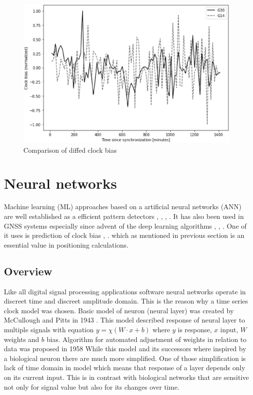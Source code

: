 \documentclass{article}
\begin{document}
\begin{figure}[htb] 
\centering
	\includegraphics[width=\textwidth]{figures/bias_normalized}
\caption{Comparison of diffed clock bias}
\label{fig:diffed_shifts}
\end{figure}

\FloatBarrier
\section{Neural networks}
Machine learning (ML) approaches based on a artificial neural networks (ANN) are
well established as a efficient pattern detectors \cite{Abiodun2019}, \cite{Faraway2008},
\cite{Khan2019}, \cite{Miller1993}.
It has also been used in GNSS systems especially since advent of the deep learning
algorithms \cite{Kim2019}, \cite{Perez2019}, \cite{Wei2016}.
One of it uses is prediction of clock bias  \cite{Indriyatmoko2008}, \cite{Wang2017}.
which as mentioned in previous section is an essential value in positioning calculations.

\subsection{Overview}  
Like all digital signal processing applications software neural networks operate in
discreet time and discreet amplitude domain. This is the reason why a time series clock model
was chosen. Basic model of neuron (neural layer) was created by McCullough and Pitts in 1943
\cite{McCulloch1943}. This model described response of neural layer to multiple signals with
equation $y= \chi (W\cdot x+b)$ where $y$ is response, $x$ input, $W$ weights and $b$ bias.
Algorithm for automated adjustment of weights in relation to data was proposed in 1958
While this model and its successors where inspired by a biological neuron there are much
more simplified. One of those simplification is lack of time domain in model which means
that response of a layer depends only on its current input.
This is in contrast with biological networks that are sensitive not only for signal value
but also for its changes over time.
\end{document}
